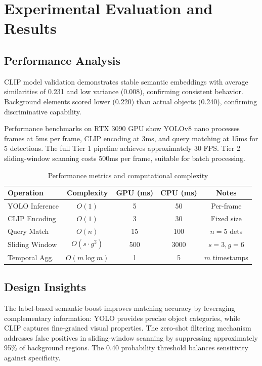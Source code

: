 \documentclass[12pt,a4paper]{article}
\begin{document}
\section{Experimental Evaluation and Results}

\subsection{Performance Analysis}

CLIP model validation demonstrates stable semantic embeddings with average similarities of 0.231 and low variance (0.008), confirming consistent behavior. Background elements scored lower (0.220) than actual objects (0.240), confirming discriminative capability.

Performance benchmarks on RTX 3090 GPU show YOLOv8 nano processes frames at 5ms per frame, CLIP encoding at 3ms, and query matching at 15ms for 5 detections. The full Tier 1 pipeline achieves approximately 30 FPS. Tier 2 sliding-window scanning costs 500ms per frame, suitable for batch processing.

\begin{table}[H]
\centering
\small
\begin{tabular}{lcccc}
\toprule
\textbf{Operation} & \textbf{Complexity} & \textbf{GPU (ms)} & \textbf{CPU (ms)} & \textbf{Notes} \\
\midrule
YOLO Inference & $O(1)$ & 5 & 50 & Per-frame \\
CLIP Encoding & $O(1)$ & 3 & 30 & Fixed size \\
Query Match & $O(n)$ & 15 & 100 & $n=5$ dets \\
Sliding Window & $O(s \cdot g^2)$ & 500 & 3000 & $s=3, g=6$ \\
Temporal Agg. & $O(m \log m)$ & 1 & 5 & $m$ timestamps \\
\bottomrule
\end{tabular}
\caption{Performance metrics and computational complexity}
\label{tab:performance}
\end{table}

\subsection{Design Insights}

The label-based semantic boost improves matching accuracy by leveraging complementary information: YOLO provides precise object categories, while CLIP captures fine-grained visual properties. The zero-shot filtering mechanism addresses false positives in sliding-window scanning by suppressing approximately 95\% of background regions. The 0.40 probability threshold balances sensitivity against specificity.
\end{document}
